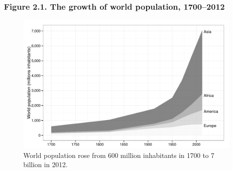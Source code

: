 \documentclass[t]{beamer}\usepackage[]{graphicx}\usepackage[]{color}
\newenvironment{knitrout}{}{} %
\begin{document}
\begin{frame}[label=Figure_2_1]
\frametitle{Figure 2.1. The growth of world population, 1700--2012}
\begin{figure}[t]
\begin{minipage}[b]{\textwidth}
\centering
\begin{knitrout}\footnotesize
{}\color{fgcolor}

{\centering \includegraphics[width=1\linewidth]{figures/bw/Figure_2_1} 

}



\end{knitrout}
\caption{World population rose from 600 million inhabitants in 1700 to 7 billion in 2012.}
\end{minipage}
\end{figure}
\end{frame}
\end{document}
